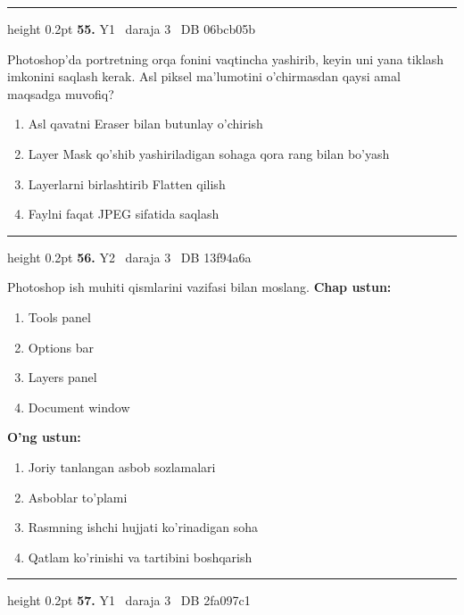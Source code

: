 \documentclass[10pt,a4paper,oneside]{article}
\begin{document}
\vspace{2mm}\hrule height 0.2pt \vspace{4mm}
\hypertarget{q55}{\textbf{\color{ink}55.}}  {\color{muted}\scriptsize Y1 \textbullet\ daraja 3 \textbullet\ DB 06bcb05b}
\par
Photoshop'da portretning orqa fonini vaqtincha yashirib, keyin uni yana tiklash imkonini saqlash kerak. Asl piksel ma'lumotini o'chirmasdan qaysi amal maqsadga muvofiq?
\begin{enumerate}[label=\Alph*),leftmargin=9mm]
\item Asl qavatni Eraser bilan butunlay o'chirish
\item Layer Mask qo'shib yashiriladigan sohaga qora rang bilan bo'yash
\item Layerlarni birlashtirib Flatten qilish
\item Faylni faqat JPEG sifatida saqlash
\end{enumerate}
\vspace{2mm}\hrule height 0.2pt \vspace{4mm}
\hypertarget{q56}{\textbf{\color{ink}56.}}  {\color{muted}\scriptsize Y2 \textbullet\ daraja 3 \textbullet\ DB 13f94a6a}
\par
Photoshop ish muhiti qismlarini vazifasi bilan moslang.
\textbf{\footnotesize Chap ustun:}
\begin{enumerate}[label=\arabic*),leftmargin=9mm]
\item Tools panel
\item Options bar
\item Layers panel
\item Document window
\end{enumerate}
\textbf{\footnotesize O'ng ustun:}
\begin{enumerate}[label=\Alph*),leftmargin=9mm]
\item Joriy tanlangan asbob sozlamalari
\item Asboblar to'plami
\item Rasmning ishchi hujjati ko'rinadigan soha
\item Qatlam ko'rinishi va tartibini boshqarish
\end{enumerate}
\vspace{2mm}\hrule height 0.2pt \vspace{4mm}
\hypertarget{q57}{\textbf{\color{ink}57.}}  {\color{muted}\scriptsize Y1 \textbullet\ daraja 3 \textbullet\ DB 2fa097c1}
\par
\end{document}
